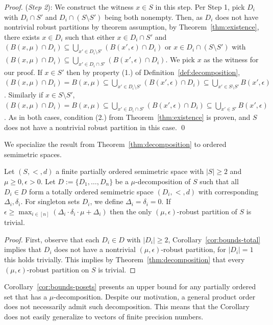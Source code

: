 \begin{proof}
    (\emph{Step 2}): 
    We construct the witness $x \in S$ in this step. Per Step 1, pick $D_i$ with $D_i \cap S'$ and $D_i \cap (S \setminus S')$ being both nonempty. Then, as $D_i$ does not have nontrivial robust partitions by theorem assumption, by Theorem~\ref{thm:existence}, there exists $x \in D_i$ such that either $x \in D_i \cap S'$ and $(B(x,\mu) \cap D_i) \subseteq \bigcup_{x' \in D_i \setminus S'} (B(x', \epsilon) \cap D_i)$ or $x \in D_i \cap (S \setminus S')$ with $(B(x,\mu) \cap D_i) \subseteq \bigcup_{x' \in D_i \cap S'} (B(x', \epsilon) \cap D_i)$. We pick $x$ as the witness for our proof. If $x \in S'$ then by property (1.) of Definition~\ref{def:decomposition}, $(B(x,\mu) \cap D_i) = B(x, \mu) \subseteq \bigcup_{x' \in D_i \setminus S'} (B(x', \epsilon) \cap D_i) \subseteq \bigcup_{x' \in S \setminus S'} B(x', \epsilon)$. Similarly if $x \in S \setminus S'$, $(B(x,\mu) \cap D_i) = B(x, \mu) \subseteq \bigcup_{x' \in D_i \cap S'} (B(x', \epsilon) \cap D_i) \subseteq \bigcup_{x' \in S'} B(x', \epsilon)$ . As in both cases, condition (2.) from Theorem~\ref{thm:existence} is proven, and $S$ does not have a nontrivial robust partition in this case.
    \qed
\end{proof}

We specialize the result from Theorem~\ref{thm:decomposition} to ordered semimetric spaces.

\begin{corollary}
    \label{cor:bounds-posets}
    Let $(S, <, d)$ a finite partially ordered semimetric space with $|S| \geq 2$ and $\mu \geq 0, \epsilon > 0$. Let $D := \{D_1, \dots, D_n\}$ be a $\mu$-decomposition of $S$ such that all $D_i \in D$ form a totally ordered semimetric space $(D_i, <, d)$ with corresponding $\Delta_i, \delta_i$. For singleton sets $D_i$, we define $\Delta_i = \delta_i = 0$. If $\epsilon \geq \max_{i \in [n]}(\Delta_i \cdot \delta_i \cdot \mu + \Delta_i)$ then the only $(\mu, \epsilon)$-robust partition of $S$ is trivial.
\end{corollary}
\begin{proof}
    First, observe that each $D_i \in D$ with $|D_i| \geq 2$, Corollary~\ref{cor:bounds-total} implies that $D_i$ does not have a nontrivial $(\mu, \epsilon)$-robust partition, for $|D_i| = 1$ this holds trivially. This implies by Theorem~\ref{thm:decomposition} that every $(\mu, \epsilon)$-robust partition on $S$ is trivial.
\end{proof}

Corollary~\ref{cor:bounds-posets} presents an upper bound for any partially ordered set that has a $\mu$-decomposition. Despite our motivation, a general product order does not necessarily admit such decomposition. This means that the Corollary does not easily generalize to vectors of finite precision numbers.
